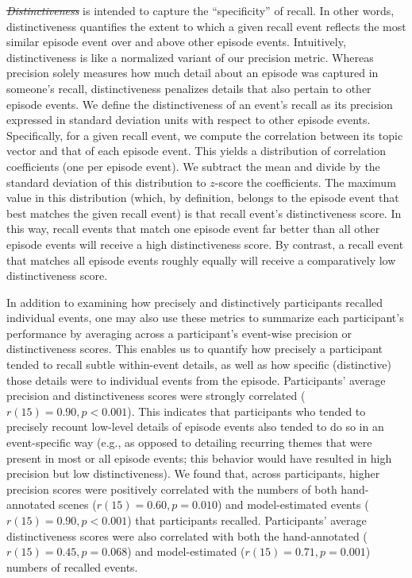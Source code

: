 \documentclass[10pt]{article}
\renewcommand{\includegraphics}[2][]{} %
\providecommand{\DIFaddtex}[1]{{\protect\color{blue}\uwave{#1}}} %
\providecommand{\DIFdeltex}[1]{{\protect\color{red}\sout{#1}}}                      %
\providecommand{\DIFaddbegin}{} %
\providecommand{\DIFaddend}{} %
\providecommand{\DIFdelbegin}{} %
\providecommand{\DIFdelend}{} %
\providecommand{\DIFadd}[1]{\texorpdfstring{\DIFaddtex{#1}}{#1}} %
\providecommand{\DIFdel}[1]{\texorpdfstring{\DIFdeltex{#1}}{}} %
\newcommand{\DIFscaledelfig}{0.5}
\newlength{\DIFdelgraphicswidth} %
\newlength{\DIFdelgraphicsheight} %
\newcommand{\DIFaddincludegraphics}[2][]{{\color{blue}\fbox{\DIFOincludegraphics[#1]{#2}}}} %
\newcommand{\DIFdelincludegraphics}[2][]{%
\sbox{\DIFdelgraphicsbox}{\DIFOincludegraphics[#1]{#2}}%
\settoboxwidth{\DIFdelgraphicswidth}{\DIFdelgraphicsbox} %
\settoboxtotalheight{\DIFdelgraphicsheight}{\DIFdelgraphicsbox} %
\scalebox{\DIFscaledelfig}{%
\parbox[b]{\DIFdelgraphicswidth}{\usebox{\DIFdelgraphicsbox}\\[-\baselineskip] \rule{\DIFdelgraphicswidth}{0em}}\llap{\resizebox{\DIFdelgraphicswidth}{\DIFdelgraphicsheight}{%
\setlength{\unitlength}{\DIFdelgraphicswidth}%
\begin{picture}(1,1)%
\thicklines\linethickness{2pt} %
{\color[rgb]{1,0,0}\put(0,0){\framebox(1,1){}}}%
{\color[rgb]{1,0,0}\put(0,0){\line( 1,1){1}}}%
{\color[rgb]{1,0,0}\put(0,1){\line(1,-1){1}}}%
\end{picture}%
}\hspace*{3pt}}} %
} %
\DeclareRobustCommand{\DIFaddbegin}{\DIFOaddbegin \let\includegraphics\DIFaddincludegraphics} %
\DeclareRobustCommand{\DIFaddend}{\DIFOaddend \let\includegraphics\DIFOincludegraphics} %
\DeclareRobustCommand{\DIFdelbegin}{\DIFOdelbegin \let\includegraphics\DIFdelincludegraphics} %
\DeclareRobustCommand{\DIFdelend}{\DIFOaddend \let\includegraphics\DIFOincludegraphics} %
\begin{document}
\DIFdelbegin \textit{\DIFdel{Distinctiveness}} %
\DIFdelend \DIFaddbegin \DIFadd{Distinctiveness }\DIFaddend is intended to capture the ``specificity'' of recall.  In other words, distinctiveness quantifies the extent to which a given recall event reflects the most similar episode event over and above other episode events.  Intuitively, distinctiveness is like a normalized variant of our precision metric.  Whereas precision solely measures how much detail about an episode was captured in someone's recall, distinctiveness penalizes details that also pertain to other episode events.  We define the distinctiveness of an event's recall as its precision expressed in standard deviation units with respect to other episode events.  Specifically, for a given recall event, we compute the correlation between its topic vector and that of each episode event.  This yields a distribution of correlation coefficients (one per episode event).  We subtract the mean and divide by the standard deviation of this distribution to $z$-score the coefficients.  The maximum value in this distribution (which, by definition, belongs to the episode event that best matches the given recall event) is that recall event's distinctiveness score.  In this way, recall events that match one episode event far better than all other episode events will receive a high distinctiveness score.  By contrast, a recall event that matches all episode events roughly equally will receive a comparatively low distinctiveness score.

In addition to examining how precisely and distinctively participants recalled individual events, one may also use these metrics to summarize each participant's performance by averaging across a participant's event-wise precision or distinctiveness scores.  This enables us to quantify how precisely a participant tended to recall subtle within-event details, as well as how specific (distinctive) those details were to individual events from the episode.  Participants' average precision and distinctiveness scores were strongly correlated ($r(15) = 0.90, p < 0.001$).  This indicates that participants who tended to precisely recount low-level details of episode events also tended to do so in an event-specific way (e.g., as opposed to detailing recurring themes that were present in most or all episode events; this behavior would have resulted in high precision but low distinctiveness).  We found that, across participants, higher precision scores were positively correlated with the numbers of both hand-annotated scenes ($r(15) = 0.60, p = 0.010$) and model-estimated events ($r(15) = 0.90, p < 0.001$) that participants recalled.  Participants' average distinctiveness scores were also \DIFaddbegin \DIFadd{marginally }\DIFaddend correlated with both the hand-annotated ($r(15) = 0.45, p = 0.068$) and model-estimated ($r(15) = 0.71, p = 0.001$) numbers of recalled events.
\end{document}
